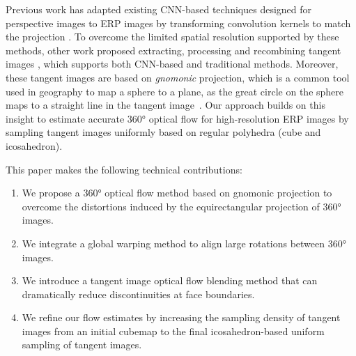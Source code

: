 %
Previous work has adapted existing CNN-based techniques designed for perspective images to ERP images by transforming convolution kernels to match the projection \cite{CoorsCG2018, SuG2019, TatenNT2018}.
%
To overcome the limited spatial resolution supported by these methods, other work proposed extracting, processing and recombining tangent images \cite{EderSLF2020, LuoZSX2019, ZhangLSC2019, LeeJYJY2019, WangHCLYSCS2018, WangYSCT2020}, which supports both CNN-based and traditional methods.
%
%
Moreover, these tangent images are based on \emph{gnomonic} projection, which is a common tool used in geography to map a sphere to a plane, as the great circle on the sphere maps to a straight line in the tangent image~\cite{EderSLF2020}.
%
Our approach builds on this insight to estimate accurate 360° optical flow for high-resolution ERP images by sampling tangent images uniformly based on regular polyhedra (cube and icosahedron).


This paper makes the following technical contributions:
%
\begin{enumerate}[nosep]
\item 
We propose a 360° optical flow method based on gnomonic projection to overcome the distortions induced by the  equirectangular projection of 360° images.

\item
We integrate a global warping method to align large rotations between 360° images.

\item
We introduce a tangent image optical flow blending method that can dramatically reduce discontinuities at face boundaries.

\item 
We refine our flow estimates by increasing the sampling density of tangent images from an initial cubemap to the final icosahedron-based uniform sampling of tangent images.
\end{enumerate}
